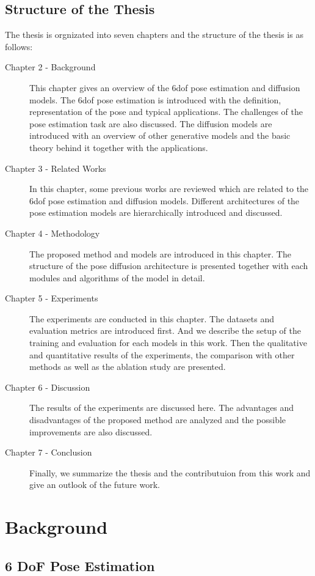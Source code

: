 \documentclass[12pt,DIV14,BCOR12mm,a4paper,footinclude=false,headinclude,parskip=half-,twoside,openright,cleardoublepage=empty,toc=index,bibliography=totoc,listof=totoc]{scrreprt}
\numberwithin{equation}{chapter}
\begin{document}
\section{Structure of the Thesis}
The thesis is orgnizated into seven chapters and the structure of the thesis is as follows:
\begin{description}
  \item[Chapter 2 - Background] This chapter gives an overview of the \gls{6dof} pose estimation and diffusion models. The \gls{6dof} pose estimation is introduced with the definition, representation of the pose and typical applications. The challenges of the pose estimation task are also discussed. The diffusion models are introduced with an overview of other generative models and the basic theory behind it together with the applications.
  \item[Chapter 3 - Related Works] In this chapter, some previous works are reviewed which are related to the \gls{6dof} pose estimation and diffusion models. Different architectures of the pose estimation models are hierarchically introduced and discussed.
  \item[Chapter 4 - Methodology] The proposed method and models are introduced in this chapter. The structure of the pose diffusion architecture is presented together with each modules and algorithms of the model in detail.
  \item[Chapter 5 - Experiments] The experiments are conducted in this chapter. The datasets and evaluation metrics are introduced first. And we describe the setup of the training and evaluation for each models in this work. Then the qualitative and quantitative results of the experiments, the comparison with other methods as well as the ablation study are presented.
  \item[Chapter 6 - Discussion] The results of the experiments are discussed here. The advantages and disadvantages of the proposed method are analyzed and the possible improvements are also discussed.
  \item[Chapter 7 - Conclusion ] Finally, we summarize the thesis and the contributuion from this work and give an outlook of the future work.
\end{description} 

\chapter{Background}
\section{6 DoF Pose Estimation}
\end{document}
